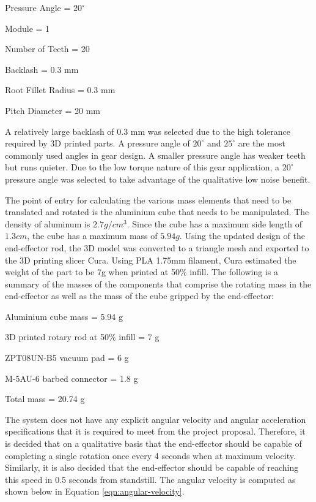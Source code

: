 \begin{compactitem}
	\item Pressure Angle = $20 ^\circ$
	\item Module = 1
	\item Number of Teeth = 20
	\item Backlash = 0.3 mm
	\item Root Fillet Radius = 0.3 mm
	\item Pitch Diameter = 20 mm
\end{compactitem}

A relatively large backlash of 0.3 mm was selected due to the high tolerance required by 3D printed parts. A pressure angle of $20 ^\circ$ and $25 ^\circ$ are the most commonly used angles in gear design. A smaller pressure angle has weaker teeth but runs quieter. Due to the low torque nature of this gear application, a $20 ^\circ$ pressure angle was selected to take advantage of the qualitative low noise benefit.


The point of entry for calculating the various mass elements that need to be translated and rotated is the aluminium cube that needs to be manipulated. The density of aluminum is $2.7 g/cm^3$. Since the cube has a maximum side length of $1.3 cm$, the cube has a maximum mass of $5.94 g$. Using the updated design of the end-effector rod, the 3D model was converted to a triangle mesh and exported to the 3D printing slicer Cura. Using PLA 1.75mm filament, Cura estimated the weight of the part to be 7g when printed at 50\% infill. The following is a summary of the masses of the components that comprise the rotating mass in the end-effector as well as the mass of the cube gripped by the end-effector:

\begin{compactitem}
	\item Aluminium cube mass = 5.94 g
	\item 3D printed rotary rod at 50\% infill = 7 g
	\item ZPT08UN-B5 vacuum pad = 6 g
	\item M-5AU-6 barbed connector = 1.8 g
	\item Total mass = 20.74 g
\end{compactitem}

The system does not have any explicit angular velocity and angular acceleration specifications that it is required to meet from the project proposal. Therefore, it is decided that on a qualitative basis that the end-effector should be capable of completing a single rotation once every 4 seconds when at maximum velocity. Similarly, it is also decided that the end-effector should be capable of reaching this speed in 0.5 seconds from standstill. The angular velocity is computed as shown below in Equation \ref{eqn:angular-velocity}.

